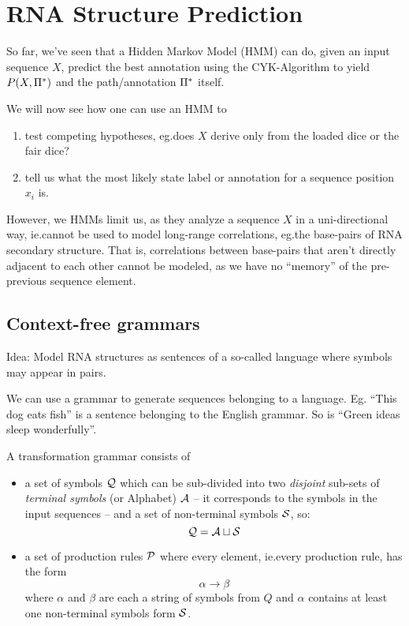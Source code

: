 \section{RNA Structure Prediction}

So far, we've seen that a Hidden Markov Model (HMM) can do, given an input
sequence \(X\), predict the best annotation using the CYK-Algorithm to yield
\(P(X,\Pi^*)\) and the path/annotation \(\Pi^*\) itself.

We will now see how one can use an HMM to
\begin{enumerate}[label=(\alph*)]
\item test competing hypotheses, eg.\@ does \(X\) derive only from the loaded
  dice or the fair dice?
\item tell us what the most likely state label or annotation for a sequence
  position \(x_i\) is.
\end{enumerate}

However, we HMMs limit us, as they analyze a sequence \(X\) in a uni-directional
way, ie.\@ cannot be used to model long-range correlations, eg.\@ the base-pairs
of RNA secondary structure.  That is, correlations between base-pairs that
aren't directly adjacent to each other cannot be modeled, as we have no
\enquote{memory} of the pre-previous sequence element.

\subsection{Context-free grammars}

Idea: Model RNA structures as sentences of a so-called language where symbols
may appear in pairs.


We can use a grammar to generate sequences belonging to a language.  Eg.\@
\enquote{This dog eats fish} is a sentence belonging to the English grammar. So
is \enquote{Green ideas sleep wonderfully}.
\begin{definition}
A transformation grammar consists of
\begin{itemize}
\item a set of symbols \(\mathcal{Q}\) which can
  be sub-divided into two \emph{disjoint} sub-sets of \emph{terminal symbols}
  (or Alphabet) \(\mathcal{A}\) -- it corresponds to the symbols in the input
  sequences -- and a set of non-terminal symbols \(\mathcal{S}\), so:
  \[
    \mathcal{Q}=\mathcal{A}\sqcup\mathcal{S}
  \]
\item a set of production rules \(\mathcal{P}\) where every element, ie.\@ every
  production rule, has the form
  \[
    \alpha \to \beta
  \]
  where \(\alpha\) and \(\beta\) are each a string of symbols from \(Q\) and
  \(\alpha\) contains at least one non-terminal symbols form \(\mathcal{S}\). 
\end{itemize}
\end{definition}

